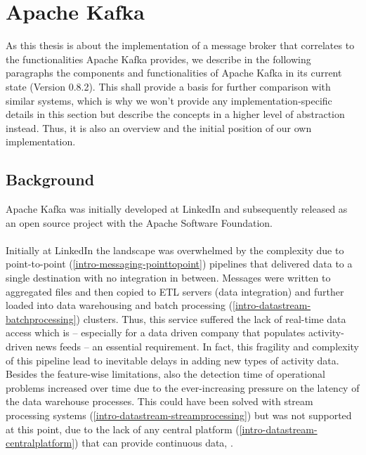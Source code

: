 \chapter{Apache Kafka}
\label{intro-kafka}

As this thesis is about the implementation of a message broker that correlates
to the functionalities Apache Kafka provides, we describe in the following paragraphs the
components and functionalities of Apache Kafka in its current state (Version
0.8.2). This shall provide a basis for further comparison with
similar systems, which is why we won't provide any implementation-specific details in 
this section but describe the concepts in a higher level of
abstraction instead. Thus, it is also an overview and the initial position of our
own implementation. 

\section{Background}

Apache Kafka was initially developed at LinkedIn\cite{linkedin} and subsequently
released as an open source project with the Apache Software
Foundation\cite{apachefoundation}. 
\\ \\
Initially at LinkedIn the landscape was overwhelmed by the complexity due to
point-to-point (\ref{intro-messaging-pointtopoint})
pipelines that delivered data to a single destination with no
integration in between. Messages were written to aggregated files and then copied
to ETL servers (data integration) and further loaded into data warehousing and batch
processing (\ref{intro-datastream-batchprocessing})
clusters. Thus, this service suffered the lack of real-time data access which
is -- especially for a data driven company that populates activity-driven news
feeds -- an essential requirement. In fact, this fragility and complexity of this
pipeline lead to inevitable delays in adding new types of activity data.
Besides the feature-wise limitations, also the detection time of operational
problems increased over time due to the ever-increasing pressure on the latency
of the data warehouse processes. This could have been solved with
stream processing systems (\ref{intro-datastream-streamprocessing}) but was not
supported at this point, due to the lack of any central platform
(\ref{intro-datastream-centralplatform}) that can provide continuous data, .
\cite{goodhope2012building}

